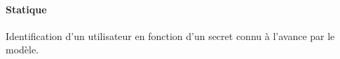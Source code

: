 \paragraph{Statique}
Identification d'un utilisateur en fonction d'un secret connu à l'avance par le modèle.